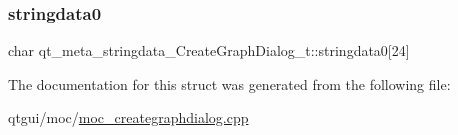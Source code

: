 \subsubsection{\texorpdfstring{stringdata0}{stringdata0}}
{\footnotesize\ttfamily char qt\+\_\+meta\+\_\+stringdata\+\_\+\+Create\+Graph\+Dialog\+\_\+t\+::stringdata0\mbox{[}24\mbox{]}}



The documentation for this struct was generated from the following file\+:\begin{DoxyCompactItemize}
\item 
qtgui/moc/\mbox{\hyperlink{moc__creategraphdialog_8cpp}{moc\+\_\+creategraphdialog.\+cpp}}\end{DoxyCompactItemize}
